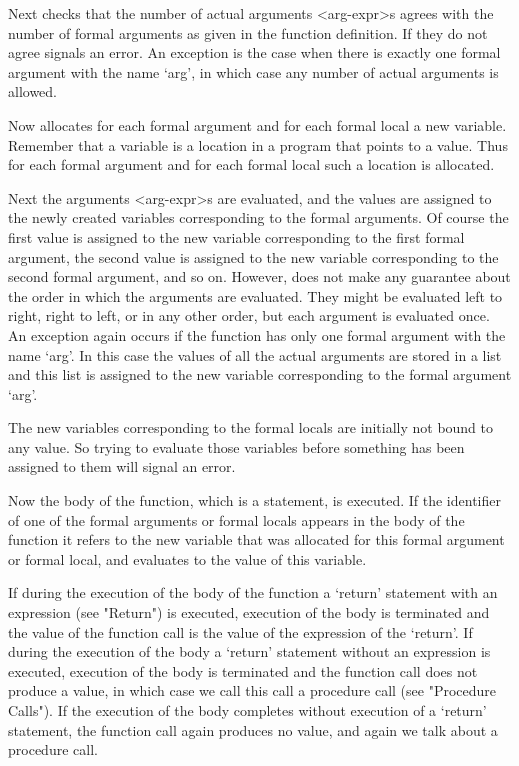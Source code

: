 Next {\GAP} checks that the number of actual arguments <arg-expr>s agrees
with the number of formal arguments as given in the function definition.
If they do not agree {\GAP} signals an error. An exception is the case
when there is exactly one formal argument with the name `arg', in which
case any number of actual arguments is allowed.

Now {\GAP} allocates for each formal argument and for each formal local a
new variable. Remember that a variable is a location in a {\GAP} program
that points to a value. Thus for  each formal argument and for each
formal local such a location is allocated.

Next the arguments <arg-expr>s are evaluated, and the values are assigned
to the newly created variables corresponding to the formal arguments. Of
course the first value is assigned to the new variable corresponding to
the first formal argument, the second  value  is assigned to the new
variable corresponding  to  the second  formal argument, and  so on.
However, {\GAP} does not make any guarantee about the order in which the
arguments are evaluated. They might be evaluated left to right, right to
left, or in any other order, but each argument is evaluated once. An
exception again occurs if the function has only one formal argument with
the name `arg'. In this case the values of all the actual arguments are
stored in  a list and this  list is assigned to the  new variable
corresponding to the formal argument `arg'.

The new variables corresponding to the formal locals are initially not
bound to any  value.  So trying  to evaluate those  variables before
something has been assigned to them will signal an error.

Now the body of the function, which is a statement, is executed. If the
identifier of one of the formal arguments or formal locals appears in the
body of the function it refers to the new variable that was allocated for
this formal argument or formal local, and evaluates to the value of this
variable.

If during the execution of the body of the function a `return' statement
with an expression (see "Return") is executed, execution of the body is
terminated and the value of the function call is the value of the
expression of the `return'. If during the execution of the body a
`return' statement without an expression is executed, execution of the
body is terminated and the function call does not produce a value, in
which case we call this call a procedure call (see "Procedure Calls").
If the execution of the body completes without execution of a `return'
statement, the function call again produces no value, and again we talk
about a procedure call.

